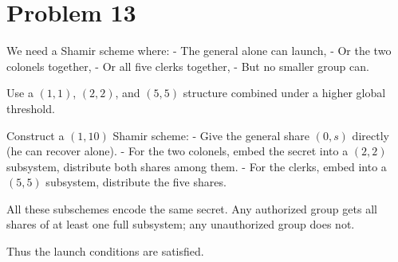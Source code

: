 \section*{Problem 13}

We need a Shamir scheme where:
- The general alone can launch,
- Or the two colonels together,
- Or all five clerks together,
- But no smaller group can.

Use a \((1,1)\), \((2,2)\), and \((5,5)\) structure combined under a higher global threshold.

Construct a \((1,10)\) Shamir scheme:
- Give the general share \((0,s)\) directly (he can recover alone).
- For the two colonels, embed the secret into a \((2,2)\) subsystem,
  distribute both shares among them.
- For the clerks, embed into a \((5,5)\) subsystem,
  distribute the five shares.

All these subschemes encode the same secret.  
Any authorized group gets all shares of at least one full subsystem; any unauthorized group does not.

Thus the launch conditions are satisfied.

